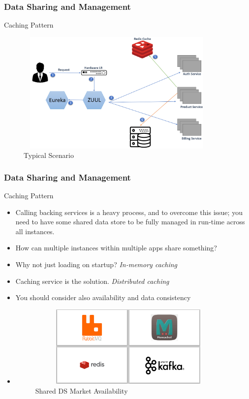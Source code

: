 \documentclass{beamer}
\begin{document}
	\begin{frame}
		\frametitle{Data Sharing and Management}
		Caching Pattern
		\begin{figure}[h]
			\includegraphics[width=100mm,height= 60mm, scale=1]{img/flow-4.PNG}
			\caption{Typical Scenario}
		\end{figure}
	\end{frame}


	\begin{frame}
	\frametitle{Data Sharing and Management}
	Caching Pattern
	\begin{itemize}
		\item<1->[] \scriptsize{Calling backing services is a heavy process, and to overcome this issue; you need to have some shared data store to be fully managed in run-time across all instances.}
		\vspace{1mm}
		\item<1-> \scriptsize{How can multiple instances within multiple apps share something?}
		\item<1-> \scriptsize{Why not just loading on startup? \textit{In-memory caching}}
		\item<1-> \scriptsize{Caching service is the solution. \textit{Distributed caching}}
		\item<3-> \scriptsize{\alert{You should consider also availability and data consistency}}
		\item<2->[]
		\begin{figure}[h]
			\includegraphics[width=100mm,height= 40mm, scale=1]{img/shared-ds.PNG}
			\caption{Shared DS Market Availability}
		\end{figure}
	\end{itemize}
	\end{frame}
	
\end{document}
